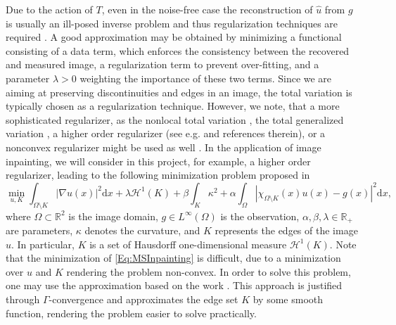 \documentclass[enabledeprecatedfontcommands,cleardoublepage=empty,headsepline,twoside,11pt,DIV=15,BCOR=12mm,final]{scrartcl}
\newcommand{\R}{{\mathbb R}}
\begin{document}
Due to the action of $T$, even in the noise-free case the reconstruction of $\hat{u}$ from $g$ is usually an ill-posed inverse problem and thus regularization techniques are required \cite{EngHanNeu}. A good approximation may be obtained by minimizing a functional consisting of a data term, which enforces the consistency between the recovered and measured image, a regularization term to prevent over-fitting, and a parameter $\lambda>0$ weighting the importance of these two terms. Since we are aiming at preserving discontinuities and edges in an image, the total variation is typically chosen as a regularization technique. However, we note, that a more sophisticated regularizer, as the nonlocal total variation \cite{KinOshJon}, the total generalized variation \cite{BreKunPoc}, a higher order regularizer (see e.g. \cite{PapSch} and references therein), or a nonconvex regularizer might be used as well \cite{}. %
In the application of image inpainting, we will consider in this project, for example, a higher order regularizer, leading to the following minimization problem proposed in \cite{EseShe} %
\begin{equation}\label{Eq:MSInpainting}
\min_{u,K} \int_{\Omega\setminus K} |\nabla u(x) |^2 \text{d}x + \lambda \mathcal{H}^1(K) + \beta \int_K \kappa^2 + \alpha \int_\Omega |\chi_{\Omega\setminus K}(x) u(x) - g(x)|^2 \text{d}x,
\end{equation}
where $\Omega\subset \R^2$ is the image domain, $g\in L^\infty(\Omega)$ is the observation, $\alpha,\beta,\lambda\in \R_+$ are parameters, $\kappa$ denotes the curvature, and $K$ represents the edges of the image $u$. In particular, $K$ is a set of Hausdorff one-dimensional measure $\mathcal{H}^1(K)$.
Note that the minimization of \eqref{Eq:MSInpainting} is difficult, due to a minimization over $u$ and $K$ rendering the problem non-convex. In order to solve this problem, one may use the approximation based on  the work  \cite{AmbTor}. This approach is justified through $\Gamma$-convergence and approximates the edge set $K$ by some smooth function, rendering the problem easier to solve practically. 
\end{document}
